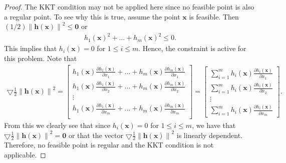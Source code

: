 \documentclass[12pt]{article}
\theoremstyle{definition}
\newcommand{\vc}[1]{\boldsymbol{#1}}
\newcommand{\norm}[1]{\left\lVert#1\right\rVert}
\begin{document}
\begin{proof}
  The KKT condition may not be applied here since no feasible point is also a regular point. To see why this
  is true, assume the point $\vc{x}$ is feasible. Then $(1/2)\norm{\vc{h}(\vc{x})}^2 \leq \vc{0}$ or
  \begin{align*}
    h_1(\vc{x})^2 + \dots + h_m(\vc{x})^2 \leq 0.
  \end{align*}
  This implies that $h_i(\vc{x}) = 0$ for $1\leq i \leq m$. Hence, the constraint is active for this
  problem. Note that
  \begin{align*}
    \bigtriangledown \frac{1}{2}\norm{\vc{h}(\vc{x})}^2 =
    \begin{bmatrix}
      h_1(\vc{x}) \frac{\partial h_1(\vc{x})}{\partial x_1} + \dots + h_m(\vc{x}) \frac{\partial h_m(\vc{x})}{\partial x_1}\\
      h_1(\vc{x}) \frac{\partial h_1(\vc{x})}{\partial x_2} + \dots + h_m(\vc{x}) \frac{\partial h_m(\vc{x})}{\partial x_2}\\
      \vdots \\
      h_1(\vc{x}) \frac{\partial h_1(\vc{x})}{\partial x_m} + \dots + h_m(\vc{x}) \frac{\partial h_m(\vc{x})}{\partial x_m}\\
    \end{bmatrix}
    =
    \begin{bmatrix}
      \sum_{i=1}^m h_i(\vc{x}) \frac{\partial h_i(\vc{x})}{\partial x_1}\\
      \sum_{i=1}^m h_i(\vc{x}) \frac{\partial h_i(\vc{x})}{\partial x_2}\\
      \vdots\\
      \sum_{i=1}^m h_i(\vc{x}) \frac{\partial h_i(\vc{x})}{\partial x_m}
    \end{bmatrix}.
  \end{align*}
  From this we clearly see that since $h_i(\vc{x}) = 0$ for $1\leq i \leq m$, we have that
  $\bigtriangledown \frac{1}{2}\norm{\vc{h}(\vc{x})}^2 = \vc{0}$ or that the vector
  $\bigtriangledown \frac{1}{2}\norm{\vc{h}(\vc{x})}^2$ is linearly dependent. Therefore, no feasible point is regular
  and the KKT condition is not applicable.
\end{proof}
\end{document}
